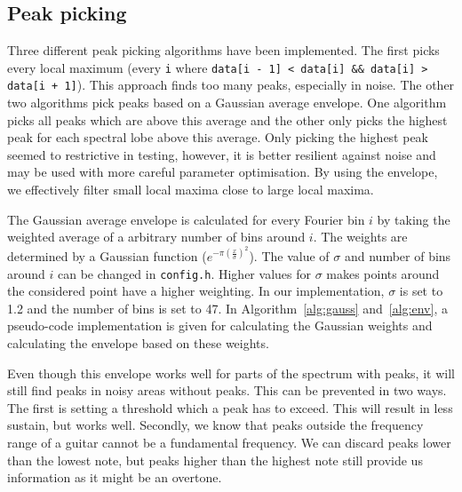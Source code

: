 \documentclass[10pt,twocolumn]{article}
\begin{document}
\subsection{Peak picking} \label{sub:peak}
Three different peak picking algorithms have been implemented. The first picks every local maximum (every \texttt{i} where \texttt{data[i - 1] < data[i] \&\& data[i] > data[i + 1]}). This approach finds too many peaks, especially in noise. The other two algorithms pick peaks based on a Gaussian average envelope. One algorithm picks all peaks which are above this average and the other only picks the highest peak for each spectral lobe above this average. Only picking the highest peak seemed to restrictive in testing, however, it is better resilient against noise and may be used with more careful parameter optimisation. By using the envelope, we effectively filter small local maxima close to large local maxima.

The Gaussian average envelope is calculated for every Fourier bin $i$ by taking the weighted average of a arbitrary number of bins around $i$. The weights are determined by a Gaussian function ($e^{-\pi(\frac{x}{\sigma})^2}$). The value of $\sigma$ and number of bins around $i$ can be changed in \texttt{config.h}. Higher values for $\sigma$ makes points around the considered point have a higher weighting. In our implementation, $\sigma$ is set to 1.2 and the number of bins is set to 47. In Algorithm~\ref{alg:gauss} and~\ref{alg:env}, a pseudo-code implementation is given for calculating the Gaussian weights and calculating the envelope based on these weights.



Even though this envelope works well for parts of the spectrum with peaks, it will still find peaks in noisy areas without peaks. This can be prevented in two ways. The first is setting a threshold which a peak has to exceed. This will result in less sustain, but works well. Secondly, we know that peaks outside the frequency range of a guitar cannot be a fundamental frequency. We can discard peaks lower than the lowest note, but peaks higher than the highest note still provide us information as it might be an overtone.
\end{document}
